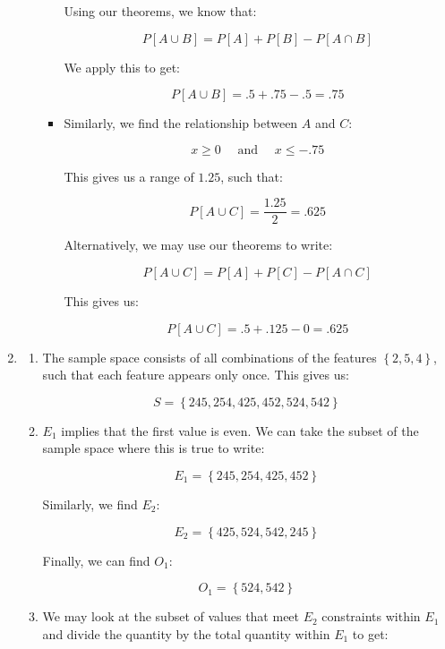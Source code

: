 \begin{enumerate}
\begin{enumerate}
\begin{itemize}
            Using our theorems, we know that:

            $$P[A\cup B]=P[A]+P[B]-P[A\cap B]$$

            We apply this to get:

            $$\boxed{P[A\cup B]=.5+.75-.5=.75}$$

          \item Similarly, we find the relationship between $A$ and $C$:

            $$x\geq 0\quad\text{ and }\quad x\leq -.75$$

            This gives us a range of $1.25$, such that:

            $$\boxed{P[A\cup C]=\frac{1.25}{2}=.625}$$

            Alternatively, we may use our theorems to write:

            $$P[A\cup C]=P[A]+P[C]-P[A\cap C]$$

            This gives us:

            $$\boxed{P[A\cup C]=.5+.125-0=.625}$$

        \end{itemize}

    \end{enumerate}

  \item 

    \begin{enumerate}

      \item The sample space consists of all combinations of the features $\left\{ 2,5,4 \right\}$, such that each feature appears only once. This gives us:

        $$\boxed{S=\left\{ 245, 254, 425, 452, 524, 542 \right\}}$$

      \item $E_1$ implies that the first value is even. We can take the subset of the sample space where this is true to write:

        $$\boxed{E_1=\left\{ 245, 254, 425, 452 \right\}}$$

        Similarly, we find $E_2$:

        $$\boxed{E_2=\left\{ 425, 524, 542, 245 \right\}}$$

        Finally, we can find $O_1$:

        $$\boxed{O_1=\left\{ 524, 542 \right\}}$$

      \item We may look at the subset of values that meet $E_2$ constraints within $E_1$ and divide the quantity by the total quantity within $E_1$ to get:


\end{enumerate}
\end{enumerate}
